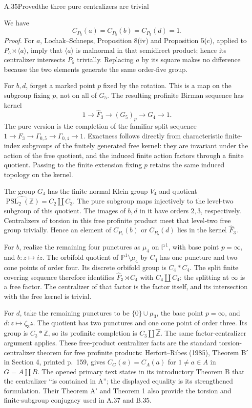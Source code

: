 \begin{statement}{A.35}{Proved}{the three pure centralizers are trivial}
\citep[Theorem B\(^{\prime}\)]{HerfortRibes1985}
\end{statement}
We have
\[
 C_{P_5}(a)=C_{P_5}(b)=C_{P_5}(d)=1.
\]
\emph{Proof.} For $a$, Lochak--Schneps, Proposition 8(iv) and
Proposition 5(c), applied to $P_5\rtimes\langle a\rangle$, imply that
$\langle a\rangle$ is malnormal in that semidirect product; hence its
centralizer intersects $P_5$ trivially. Replacing $a$ by its square makes no
difference because the two elements generate the same order-five group.

For $b,d$, forget a marked point $p$ fixed by the rotation. This is a map
on the subgroup fixing $p$, not on all of $G_5$. The resulting profinite
Birman sequence has kernel
\[
 1\longrightarrow\widehat F_3\longrightarrow
 (G_5)_p\longrightarrow G_4\longrightarrow1.
\]
The pure version is the completion of the familiar split sequence
$1\to F_3\to\Gamma_{0,5}\to\Gamma_{0,4}\to1$.
Exactness follows directly from characteristic finite-index subgroups of the
finitely generated free kernel: they are invariant under the action of the
free quotient, and the induced finite action factors through a finite
quotient. Passing to the finite extension fixing $p$ retains the same
induced topology on the kernel.

The group $G_4$ has the finite normal Klein group $V_4$ and quotient
$\widehat{\operatorname{PSL}_2(\mathbb Z)}=C_2\amalg C_3$.
The pure subgroup maps injectively to the level-two subgroup of this
quotient. The images of $b,d$ in it have orders $2,3$, respectively.
Centralizers of torsion in this free profinite product meet that level-two
free group trivially. Hence an element of $C_{P_5}(b)$ or $C_{P_5}(d)$ lies
in the kernel $\widehat F_3$.

For $b$, realize the remaining four punctures as $\mu_4$ on
$\mathbb P^1$, with base point $p=\infty$, and $b:z\mapsto iz$.
The orbifold quotient of $\mathbb P^1\setminus\mu_4$ by $C_4$ has one
puncture and two cone points of order four. Its discrete orbifold group is
$C_4*C_4$. The split finite covering sequence therefore identifies
$\widehat F_3\rtimes C_4$ with $C_4\amalg C_4$; the splitting at
$\infty$ is a free factor. The centralizer of that factor is the factor
itself, and its intersection with the free kernel is trivial.

For $d$, take the remaining punctures to be $\{0\}\cup\mu_3$, the
base point $p=\infty$, and $d:z\mapsto\zeta_3z$. The quotient has two
punctures and one cone point of order three. Its group is $C_3*\mathbb Z$,
so its profinite completion is $C_3\amalg\widehat{\mathbb Z}$.
The same factor-centralizer argument applies. These free-product
centralizer facts are the standard torsion-centralizer theorem for free
profinite products: Herfort--Ribes (1985), Theorem B$'$ in Section 4,
printed p.~159, gives $C_G(a)=C_A(a)$ for $1\ne a\in A$ in
$G=A\amalg B$. The opened primary text states in its introductory
Theorem B that the centralizer ``is contained in A''; the displayed
equality is its strengthened formulation. Their Theorem A$'$ and
Theorem 1 also provide the torsion and finite-subgroup conjugacy used
in A.37 and B.35.

